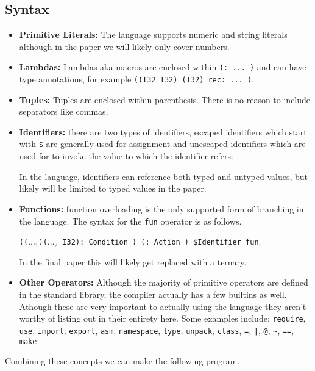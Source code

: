 \documentclass{article}
\begin{document}
\subsection{Syntax}
\begin{itemize}
    \item \textbf{Primitive Literals:} The language supports numeric and string literals although in the paper we will likely only cover numbers.

    \item \textbf{Lambdas:} Lambdas aka macros are enclosed within \texttt{(: ... )} and can have type annotations, for example \texttt{((I32 I32) (I32) rec: ... )}.

    \item \textbf{Tuples:} Tuples are enclosed within parenthesis. There is no reason to include separators like commas.

    \item \textbf{Identifiers:} there are two types of identifiers, escaped identifiers which start with \texttt{\$} are generally used for assignment and unescaped identifiers which are used for to invoke the value to which the identifier refers.
    
    In the language, identifiers can reference both typed and untyped values, but likely will be limited to typed values in the paper.

    \item \textbf{Functions:} function overloading is the only supported form of branching in the language. The syntax for the \texttt{fun} operator is as follows. 

    \texttt{(($..._1$)($..._2$ I32): Condition ) (: Action ) \$Identifier fun}.

    In the final paper this will likely get replaced with a ternary.

    \item \textbf{Other Operators:} Although the majority of primitive operators are defined in the standard library, the compiler actually has a few builtins as well. Athough these are very important to actually using the language they aren't worthy of listing out in their entirety here. Some examples include: \texttt{require}, \texttt{use}, \texttt{import}, \texttt{export}, \texttt{asm}, \texttt{namespace}, \texttt{type}, \texttt{unpack}, \texttt{class}, \texttt{=}, \texttt{|}, \texttt{@}, \texttt{\~}, \texttt{==}, \texttt{make}
\end{itemize}
    
    Combining these concepts we can make the following program.
    
\end{document}
